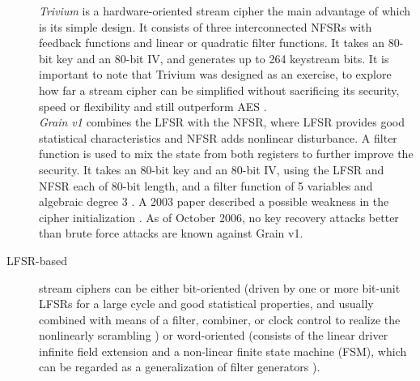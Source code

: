 \begin{description}
		\emph{Trivium} is a hardware-oriented stream cipher the main advantage of which is its simple design. It consists of three interconnected NFSRs with feedback functions and linear or quadratic filter functions. It takes an 80-bit key and an 80-bit IV, and generates up to 264 keystream bits. It is important to note that Trivium was designed as an exercise, to explore how far a stream cipher can be simplified without sacrificing its security, speed or flexibility and still outperform AES \cite{canniere2008trivium}.\\
		\emph{Grain v1} combines the LFSR with the NFSR, where LFSR provides good statistical characteristics and NFSR adds nonlinear disturbance. A filter function is used to mix the state from both registers to further improve the security. It takes an 80-bit key and an 80-bit IV, using the LFSR and NFSR each of 80-bit length, and a filter function of 5 variables and algebraic degree 3 \cite{hell2007grain}. A 2003 paper described a possible weakness in the cipher initialization \cite{kuccuk2006slide}. As of October 2006, no key recovery attacks better than brute force attacks are known against Grain v1.
		
		\item [LFSR-based] stream ciphers can be either bit-oriented (driven by one or more bit-unit LFSRs for a large cycle and good statistical properties, and usually combined with means of a filter, combiner, or clock control to realize the nonlinearly scrambling \cite{jiao2020stream}) or word-oriented (consists of the linear driver infinite field extension and a non-linear finite state machine (FSM), which can be regarded as a generalization of filter generators \cite{jiao2020stream}).
		
		\begin{figure}[h]
			

\end{figure}
\end{description}
